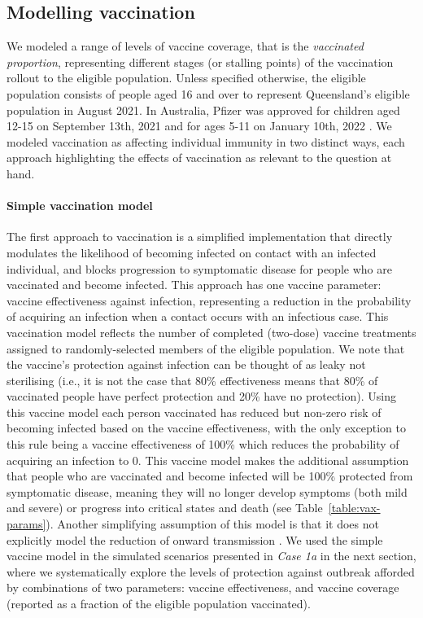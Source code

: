 \documentclass[article, a4, authoryear]{elsarticle}
\begin{document}
\subsection{Modelling vaccination}
We modeled a range of levels of vaccine coverage, that is the \textit{vaccinated proportion}, representing different stages (or stalling points) of the vaccination rollout to the eligible population. Unless specified otherwise, the eligible population consists of people aged 16 and over to represent Queensland's eligible population in August 2021. In Australia, Pfizer was approved for children aged 12-15 on September 13th, 2021 \cite{pfizer_12_15} and for ages 5-11 on January 10th, 2022 \cite{pfizer_5_11}. We modeled vaccination as affecting individual immunity in two distinct ways, each approach highlighting the effects of vaccination as relevant to the question at hand. 

\paragraph{Simple vaccination model} The first approach to vaccination \cite{kerr2020covasim} is a simplified implementation that directly modulates the likelihood of becoming infected on contact with an infected individual, and blocks progression to symptomatic disease for people who are vaccinated and become infected. This approach has one vaccine parameter: vaccine effectiveness against infection, representing a reduction in the probability of acquiring an infection when a contact occurs with an infectious case. This vaccination model reflects the number of completed (two-dose) vaccine treatments assigned to randomly-selected members of the eligible population. We note that the vaccine’s protection against infection can be thought of as leaky \cite{abeysuriyaroadmap} not sterilising (i.e., it is not the case that 80\% effectiveness means that 80\% of vaccinated people have perfect protection and 20\% have no protection). Using this vaccine model each person vaccinated has reduced but non-zero risk of becoming infected based on the vaccine effectiveness, with the only exception to this rule being a vaccine effectiveness of 100\% which reduces the probability of acquiring an infection to 0. This vaccine model makes the additional assumption that people who are vaccinated and become infected will be 100\% protected from symptomatic disease, meaning they will no longer develop symptoms (both mild and severe) or progress into critical states and death (see Table~\ref{table:vax-params}). Another simplifying assumption of this model is that it does not explicitly model the reduction of onward transmission \cite{harris2021effect, pruna2022onward, creswell2022ptrsa-onwards}. We used the simple vaccine model in the simulated scenarios presented in \textit{Case 1a} in the next section, where we systematically explore the levels of protection against outbreak afforded by combinations of two parameters: vaccine effectiveness, and vaccine coverage (reported as a fraction of the eligible population vaccinated). 
\end{document}
